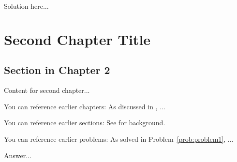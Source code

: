 \documentclass{../coursenotes}
\begin{document}
\begin{solution}
Solution here...
\end{solution}


\chapter{Second Chapter Title} \label{chap:chapter2}


\section{Section in Chapter 2}

Content for second chapter...

You can reference earlier chapters: As discussed in , ...

You can reference earlier sections: See  for background.

You can reference earlier problems: As solved in Problem~\ref{prob:problem1}, ...



\begin{solution}
Answer...
\end{solution}


\end{document}
